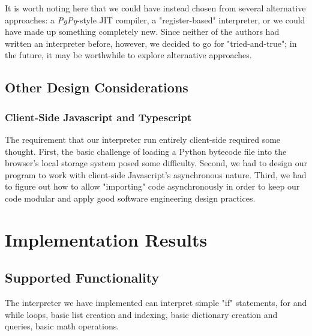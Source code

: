 \documentclass[10pt,a4paper]{article}
\begin{document}
It is worth noting here that we could have instead chosen from several alternative approaches: a \emph{PyPy}-style JIT compiler, a "register-based" interpreter, or we could have made up something completely new. Since neither of the authors had written an interpreter before, however, we decided to go for "tried-and-true"; in the future, it may be worthwhile to explore alternative approaches.

\subsection{Other Design Considerations}
\subsubsection{Client-Side Javascript and Typescript} 

The requirement that our interpreter run entirely client-side required some thought. First, the basic challenge of loading a Python bytecode file into the browser's local storage system posed some difficulty. Second, we had to design our program to work with client-side Javascript's asynchronous nature. Third, we had to figure out how to allow "importing" code asynchronously in order to keep our code modular and apply good software engineering design practices.



\section{Implementation Results}
\subsection{Supported Functionality}
The interpreter we have implemented can interpret simple "if" statements, for and while loops, basic list creation and indexing, basic dictionary creation and queries, basic math operations.

\end{document}
